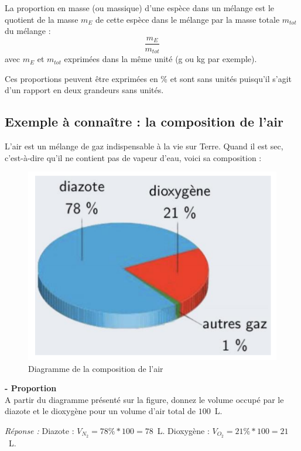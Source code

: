 \begin{tcolorbox}[colback=green!5!white,colframe=green!75!black,title=\textbf{Proportion massique}]
La proportion en masse (ou massique) d'une espèce dans un mélange est le quotient de la masse $m_{E}$ de cette espèce dans le mélange par la masse totale $m_{tot}$ du mélange :
\begin{equation*}
    \frac{m_E}{m_{tot}}
\end{equation*}
avec $m_{E}$ et $m_{tot}$ exprimées dans la même unité (g ou kg par exemple).
\end{tcolorbox}

Ces proportions peuvent être exprimées en \% et sont sans unités puisqu'il s'agit d'un rapport en deux grandeurs sans unités.

\subsection{Exemple à connaître : la composition de l'air}
L'air est un mélange de gaz indispensable à la vie sur Terre. Quand il est sec, c'est-à-dire qu'il ne contient pas de vapeur d'eau, voici sa composition :
\begin{figure}[!hbt]
    \centering
    \includegraphics[scale=0.5]{Images/Chapitre_1/Composition_air.png}
    \caption{Diagramme de la composition de l'air}
    \label{fig:compo_air}
\end{figure}

\begin{mdframed}[style=autreexo]
\textbf{ - Proportion}\\
A partir du diagramme présenté sur la figure, donnez le volume occupé par le diazote et le dioxygène pour un volume d'air total de $100$~L.
\end{mdframed}
\textit{Réponse :} Diazote : $V_{N_2}=78\%*100=78$~L. Dioxygène : $V_{O_2}=21\%*100=21$~L.

